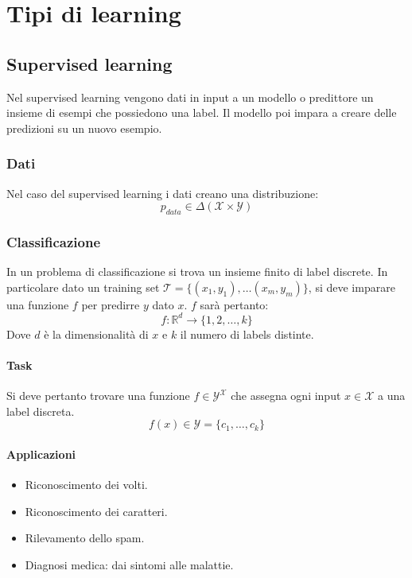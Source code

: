 \section{Tipi di learning}

	\subsection{Supervised learning}
	Nel supervised learning vengono dati in input a un modello o predittore un insieme di esempi che possiedono una label.
	Il modello poi impara a creare delle predizioni su un nuovo esempio.

		\subsubsection{Dati}
		Nel caso del supervised learning i dati creano una distribuzione:
		$$p_{data}\in\Delta(\mathcal{X}\times\mathcal{Y})$$
		
		\subsubsection{Classificazione}
		In un problema di classificazione si trova un insieme finito di label discrete.
		In particolare dato un training set $\mathcal{T} = \{(x_1, y_1),\dots(x_m, y_m)\}$, si deve imparare una funzione $f$ per predirre $y$ dato $x$.
		$f$ sar\`a pertanto:
		$$f:\mathbb{R}^d \rightarrow\{1, 2, \dots, k\}$$
		Dove $d$ \`e la dimensionalit\`a di $x$ e $k$ il numero di labels distinte.
		
		\paragraph{Task}
		Si deve pertanto trovare una funzione $f\in\mathcal{Y^X}$ che assegna ogni input $x\in\mathcal{X}$ a una label discreta.
		$$f(x)\in\mathcal{Y}=\{c_1,\dots,c_k\}$$
		\paragraph{Applicazioni}
		\begin{multicols}{2}
			\begin{itemize}
				\item Riconoscimento dei volti.
				\item Riconoscimento dei caratteri.
				\item Rilevamento dello spam.
				\item Diagnosi medica: dai sintomi alle malattie.
			\end{itemize}
		\end{multicols}
		
